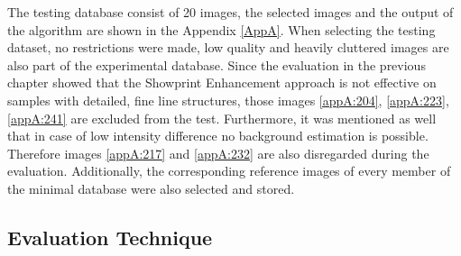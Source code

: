 \documentclass[draft,final]{vutinfth} %
\begin{document}
The testing database consist of 20 images, the selected images and the output of the algorithm are shown in the Appendix \ref{AppA}.
When selecting the testing dataset, no restrictions were made, low quality and heavily cluttered images are also part of the experimental database.
Since the evaluation in the previous chapter showed that the Showprint Enhancement approach is not effective on samples with detailed, fine line structures, those images \ref{appA:204}, \ref{appA:223}, \ref{appA:241} are excluded from the test.
Furthermore, it was mentioned as well that in case of low intensity difference no background estimation is possible. Therefore images \ref{appA:217} and \ref{appA:232} are also disregarded during the evaluation.
Additionally, the corresponding reference images of every member of the minimal database were also selected and stored.

\subsection{Evaluation Technique}
\end{document}
